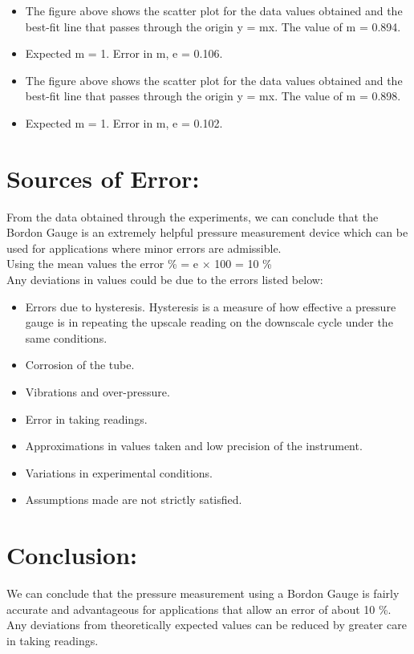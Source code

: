 \documentclass[12pt,a4paper]{article}
\begin{document}
\clearpage
\begin{figure}[!ht]
	\begin{center}
	\end{center}
\end{figure}
\begin{itemize}
\item The figure above shows the scatter plot for the data values obtained and the best-fit line that passes through the origin y = mx. The value of m = 0.894.
\item Expected m = 1. Error in m, e = 0.106.
\end{itemize}
\begin{figure}[!ht]
	\begin{center}
	\end{center}
\end{figure}
\begin{itemize}
\item The figure above shows the scatter plot for the data values obtained and the best-fit line that passes through the origin y = mx. The value of m = 0.898.
\item Expected m = 1. Error in m, e = 0.102.
\end{itemize}
\section{Sources of Error:}
From the data obtained through the experiments, we can conclude that the Bordon Gauge is an extremely helpful pressure measurement device which can be used for applications where minor errors are admissible.\\
Using the mean values the error \% = e × 100 = 10 \% \\
Any deviations in values could be due to the errors listed below:\\
\begin{itemize}
\item Errors due to hysteresis. Hysteresis is a measure of how effective a pressure gauge is in repeating the upscale reading on the downscale cycle under the same conditions.
\item Corrosion of the tube.
\item Vibrations and over-pressure.
\item Error in taking readings.
\item Approximations in values taken and low precision of the instrument.
\item Variations in experimental conditions.
\item Assumptions made are not strictly satisfied.
\end{itemize}
\section{Conclusion:}
We can conclude that the pressure measurement using a Bordon Gauge is fairly accurate and advantageous for applications that allow an error of about 10 \%. Any deviations from theoretically expected values can be reduced by greater care in taking readings.
\end{document}
